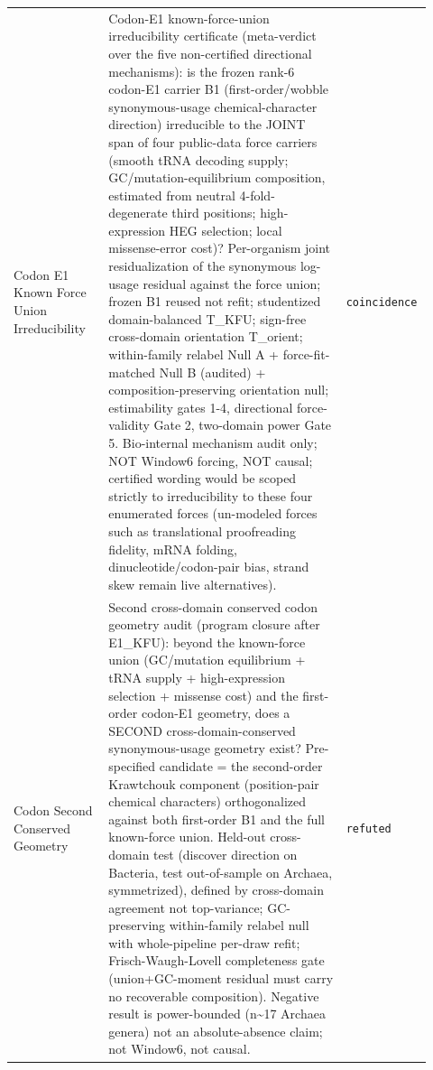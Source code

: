 \begin{longtable}{>{\raggedright\arraybackslash}p{0.22\linewidth}>{\raggedright\arraybackslash}p{0.55\linewidth}>{\raggedright\arraybackslash}p{0.15\linewidth}}
Codon E1 Known Force Union Irreducibility & Codon-E1 known-force-union irreducibility certificate (meta-verdict over the five non-certified directional mechanisms): is the frozen rank-6 codon-E1 carrier B1 (first-order/wobble synonymous-usage chemical-character direction) irreducible to the JOINT span of four public-data force carriers (smooth tRNA decoding supply; GC/mutation-equilibrium composition, estimated from neutral 4-fold-degenerate third positions; high-expression HEG selection; local missense-error cost)? Per-organism joint residualization of the synonymous log-usage residual against the force union; frozen B1 reused not refit; studentized domain-balanced T\_KFU; sign-free cross-domain orientation T\_orient; within-family relabel Null A + force-fit-matched Null B (audited) + composition-preserving orientation null; estimability gates 1-4, directional force-validity Gate 2, two-domain power Gate 5. Bio-internal mechanism audit only; NOT Window6 forcing, NOT causal; certified wording would be scoped strictly to irreducibility to these four enumerated forces (un-modeled forces such as translational proofreading fidelity, mRNA folding, dinucleotide/codon-pair bias, strand skew remain live alternatives). & \texttt{coincidence} \\
Codon Second Conserved Geometry & Second cross-domain conserved codon geometry audit (program closure after E1\_KFU): beyond the known-force union (GC/mutation equilibrium + tRNA supply + high-expression selection + missense cost) and the first-order codon-E1 geometry, does a SECOND cross-domain-conserved synonymous-usage geometry exist? Pre-specified candidate = the second-order Krawtchouk component (position-pair chemical characters) orthogonalized against both first-order B1 and the full known-force union. Held-out cross-domain test (discover direction on Bacteria, test out-of-sample on Archaea, symmetrized), defined by cross-domain agreement not top-variance; GC-preserving within-family relabel null with whole-pipeline per-draw refit; Frisch-Waugh-Lovell completeness gate (union+GC-moment residual must carry no recoverable composition). Negative result is power-bounded (n\textasciitilde{}17 Archaea genera) not an absolute-absence claim; not Window6, not causal. & \texttt{refuted} \\

\end{longtable}
